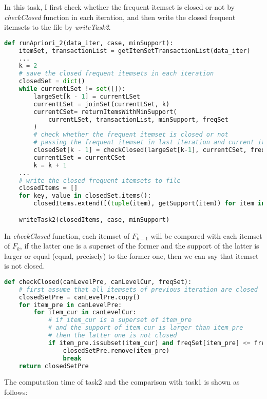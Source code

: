 \documentclass[a4paper, oneside, final, 12pt]{scrartcl} %
\begin{document}
\begingroup
\raggedright

In this task, I first check whether the frequent itemset is closed or not by \emph{checkClosed}
function in each iteration, 
and then write the closed frequent itemsets to the file by \emph{writeTask2}.

\begin{lstlisting}[language=Python]
  def runApriori_2(data_iter, case, minSupport):
    itemSet, transactionList = getItemSetTransactionList(data_iter)
    ...
    k = 2
    # save the closed frequent itemsets in each iteration
    closedSet = dict()
    while currentLSet != set([]):    
        largeSet[k - 1] = currentLSet
        currentLSet = joinSet(currentLSet, k)
        currentCSet= returnItemsWithMinSupport(
            currentLSet, transactionList, minSupport, freqSet
        )
        # check whether the frequent itemset is closed or not
        # passing the frequent itemset in last iteration and current iteration
        closedSet[k - 1] = checkClosed(largeSet[k-1], currentCSet, freqSet)
        currentLSet = currentCSet
        k = k + 1
    ...
    # write the closed frequent itemsets to file
    closedItems = []
    for key, value in closedSet.items():
        closedItems.extend([(tuple(item), getSupport(item)) for item in value])

    writeTask2(closedItems, case, minSupport)
\end{lstlisting}

In \emph{checkClosed} function, each itemset of $F_{k-1}$ will be compared with
each itemset of $F_{k}$, if the latter one is a superset of the former and
the support of the latter is larger or equal (equal, precisely) to the former one, 
then we can say that itemset is not closed.

\begin{lstlisting}[language=Python]
  def checkClosed(canLevelPre, canLevelCur, freqSet):
    # first assume that all itemsets of previous iteration are closed
    closedSetPre = canLevelPre.copy()
    for item_pre in canLevelPre:
        for item_cur in canLevelCur:
            # if item_cur is a superset of item_pre
            # and the support of item_cur is larger than item_pre
            # then the latter one is not closed
            if item_pre.issubset(item_cur) and freqSet[item_pre] <= freqSet[item_cur]:
                closedSetPre.remove(item_pre)
                break
    return closedSetPre
\end{lstlisting}

The computation time of task2 and the comparison with task1 is shown as follows:
\end{document}
